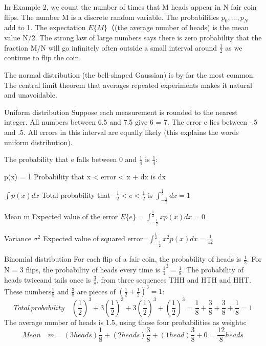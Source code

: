 	In Example 2, we count the number of times that M heads appear in N fair coin flips. The number M is a discrete random variable. The probabilities $p_0,...,p_N$ add to 1.
	The expectation $E\{M\}$（(the average number of heads) is the mean value N/2. The strong
	law of large numbers says there is zero probability that the fraction M/N will go infinitely often outside a small interval around $\frac{1}{2}$ as we continue to flip the coin.
	
	The normal distribution (the bell-shaped Gaussian) is by far the most common. The
	central limit theorem that averages repeated experiments makes it natural and unavoidable.
	
	Uniform distribution \;Suppose each measurement is rounded to the nearest integer. All
	numbers between 6.5 and 7.5 give 6 = 7. The error e lies between -.5 and .5. All errors in this interval are equally likely (this explains the words uniform distribution).
	
	 The probability that e falls between 0 and $\frac{1}{4}$ is $\frac{1}{4}$:
	 
	 \quad p(x) = 1 \quad Probability that x < error < x + dx is dx
	
	 \quad $\int p(x)dx$ \quad Total probability that$-\frac{1}{2}<e<\frac{1}{2}$ is $\int^{\frac{1}{2}}_{-\frac{1}{2}}dx=1$
	 
	 \quad Mean m \qquad Expected value of the error $E\{e\}=\int^{\frac{1}{2}}_{-\frac{1}{2}}xp(x)dx=0$
	 
	 \quad Variance $\sigma^2$ \quad Expected value of squared error=$\int^{\frac{1}{2}}_{-\frac{1}{2}} x^2 p(x)dx=\frac{1}{12}$
	
	Binomial distribution \; For each flip of a fair coin, the probability of heads is $\frac{1}{2}$.  For N = 3 flips, the probability of heads every time is $\frac{1}{1}^{3}=\frac{1}{8}$. The probability of heads twiceand tails once is $\frac{3}{8}$, from three sequences THH and HTH and HHT. These numbers$\frac{1}{8}$ and $\frac{3}{8}$ are pieces of $(\frac{1}{2}+\frac{1}{2})^{3}=1$:	
	\begin{equation*}
	Total\,probability \quad 
	(\frac{1}{2})^{3}+3(\frac{1}{2})^{3}+3(\frac{1}{2})^{3}+(\frac{1}{2})^{3}=\frac{1}{8}+\frac{3}{8}+\frac{3}{8}+\frac{1}{8}=1
	\end{equation*}
	The average number of heads is 1.5, using those four probabilities as weights:
	\begin{equation*}
	Mean \quad 
	m=(3heads)\frac{1}{8}+(2heads)\frac{3}{8}+(1head)\frac{3}{8}+0=\frac{12}{8}heads
	\end{equation*}
	
